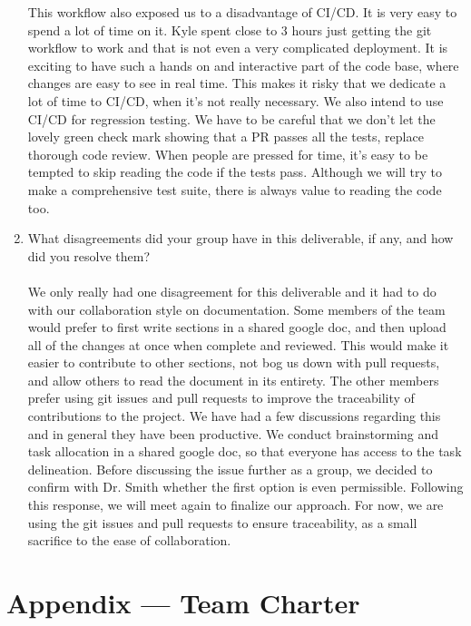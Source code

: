 \documentclass{article}
\begin{document}
\begin{enumerate}
    This workflow also exposed us to a disadvantage of CI/CD. It is very easy to spend a lot of time on it. Kyle spent close to 3 hours just getting the git workflow to work
    and that is not even a very complicated deployment. It is exciting to have such a hands on and interactive part of the code base, where changes are easy
    to see in real time. This makes it risky that we dedicate a lot of time to CI/CD, when it's not really necessary. We also intend to use CI/CD for regression testing.
    We have to be careful that we don't let the lovely green check mark showing that a PR passes all the tests, replace thorough code review. When people are pressed for time, it's
    easy to be tempted to skip reading the code if the tests pass. Although we will try to make a comprehensive test suite, there is always value to reading the code too.

    \item What disagreements did your group have in this deliverable, if any,
    and how did you resolve them?\\\\
    We only really had one disagreement for this deliverable and it had to do with our collaboration style on documentation. Some members of the team would prefer to 
    first write sections in a shared google doc, and then upload all of the changes at once when complete and reviewed. This would make it easier to contribute to 
    other sections, not bog us down with pull requests, and allow others to read the document in its entirety. The other members prefer using git issues and pull requests
    to improve the traceability of contributions to the project. We have had a few discussions regarding this and in general they have been productive. We conduct
    brainstorming and task allocation in a shared google doc, so that everyone has access to the task delineation. Before discussing the issue further as a group,
    we decided to confirm with Dr. Smith whether the first option is even permissible. Following this response, we will meet again to finalize our approach. For now, 
    we are using the git issues and pull requests to ensure traceability, as a small sacrifice to the ease of collaboration.
\end{enumerate}



\newpage{}

\section*{Appendix --- Team Charter}
\end{document}
